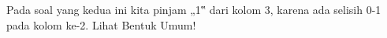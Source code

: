 \documentclass{article}
\begin{document}
\begin{enumerate}
\begin{enumerate}
Pada soal yang kedua ini kita pinjam „1‟ dari kolom 3, karena ada selisih 0-1 pada kolom ke-2. Lihat Bentuk Umum! \\









\end{enumerate}



\end{enumerate}
\end{document}
